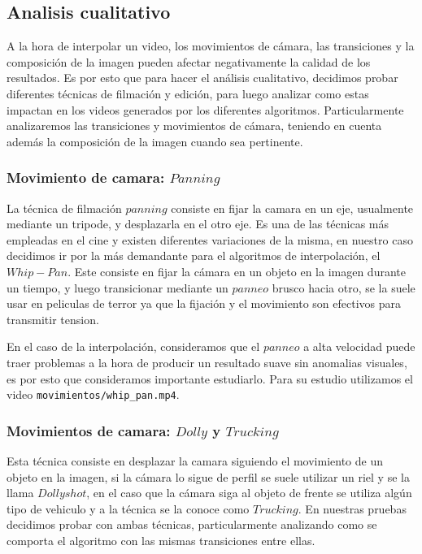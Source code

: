 \subsection{Analisis cualitativo}

A la hora de interpolar un video, los movimientos de cámara, las transiciones y la composición de la imagen pueden afectar negativamente la calidad de los resultados. Es por esto que para hacer el análisis cualitativo, decidimos probar diferentes técnicas de filmación y edición, para luego analizar como estas impactan en los videos generados por los diferentes algoritmos. Particularmente analizaremos las transiciones y movimientos de cámara, teniendo en cuenta además la composición de la imagen cuando sea pertinente.

\subsubsection{Movimiento de camara: $Panning$}

La técnica de filmación $panning$ consiste en fijar la camara en un eje, usualmente mediante un tripode, y desplazarla en el otro eje. Es una de las técnicas más empleadas en el cine y existen diferentes variaciones de la misma, en nuestro caso decidimos ir por la más demandante para el algoritmos de interpolación, el $Whip-Pan$. Este consiste en fijar la cámara en un objeto en la imagen durante un tiempo, y luego transicionar mediante un $panneo$ brusco hacia otro, se la suele usar en peliculas de terror ya que la fijación y el movimiento son efectivos para transmitir tension.

En el caso de la interpolación, consideramos que el $panneo$ a alta velocidad puede traer problemas a la hora de producir un resultado suave sin anomalias visuales, es por esto que consideramos importante estudiarlo. Para su estudio utilizamos el video \texttt{movimientos/whip\_pan.mp4}.

\subsubsection{Movimientos de camara: $Dolly$ y $Trucking$}

Esta técnica consiste en desplazar la camara siguiendo el movimiento de un objeto en la imagen, si la cámara lo sigue de perfil se suele utilizar un riel y se la llama $Dolly shot$, en el caso que la cámara siga al objeto de frente se utiliza algún tipo de vehiculo y a la técnica se la conoce como $Trucking$. En nuestras pruebas decidimos probar con ambas técnicas, particularmente analizando como se comporta el algoritmo con las mismas transiciones entre ellas.

